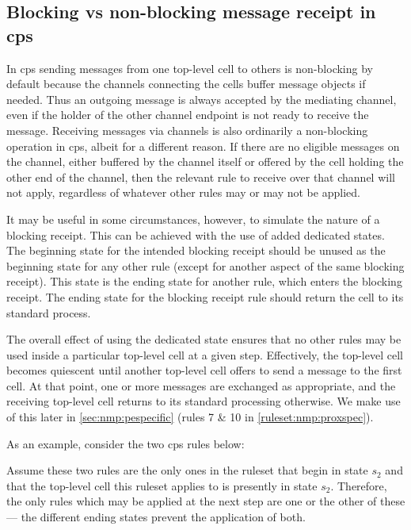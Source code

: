 \subsection{\label{sec:nmp:blocking}Blocking vs non-blocking message receipt in \texorpdfstring{\gls{cps}}{cP systems}}
In \gls{cps} sending messages from one top-level cell to others is non-blocking by default because the channels connecting the cells buffer message objects if needed. Thus an outgoing message is always accepted by the mediating channel, even if the holder of the other channel endpoint is not ready to receive the message.  Receiving messages via channels is also ordinarily a non-blocking operation in \gls{cps}, albeit for a different reason.  If there are no eligible messages on the channel, either buffered by the channel itself or offered by the cell holding the other end of the channel, then the relevant rule to receive over that channel will not apply, regardless of whatever other rules may or may not be applied.

It may be useful in some circumstances, however, to simulate the nature of a blocking receipt.  This can be achieved with the use of added dedicated states.  The beginning state for the intended blocking receipt should be unused as the beginning state for any other rule (except for another aspect of the same blocking receipt).  This state is the ending state for another rule, which enters the blocking receipt.  The ending state for the blocking receipt rule should return the cell to its standard process.

The overall effect of using the dedicated state ensures that no other rules may be used inside a particular top-level cell at a given step.  Effectively, the top-level cell becomes quiescent until another top-level cell offers to send a message to the first cell.  At that point, one or more messages are exchanged as appropriate, and the receiving top-level cell returns to its standard processing otherwise.  We make use of this later in \cref{sec:nmp:pespecific} (rules 7 \& 10 in \cref{ruleset:nmp:proxspec}).

As an example, consider the two \gls{cps} rules below:
\begin{framed}
\vspace{-0.3cm}
\vspace{-0.7cm}
\end{framed}\noindent
Assume these two rules are the only ones in the ruleset that begin in state \(s_2\) and that the top-level cell this ruleset applies to is presently in state \(s_2\).  Therefore, the only rules which may be applied at the next step are one or the other of these --- the different ending states prevent the application of both.

